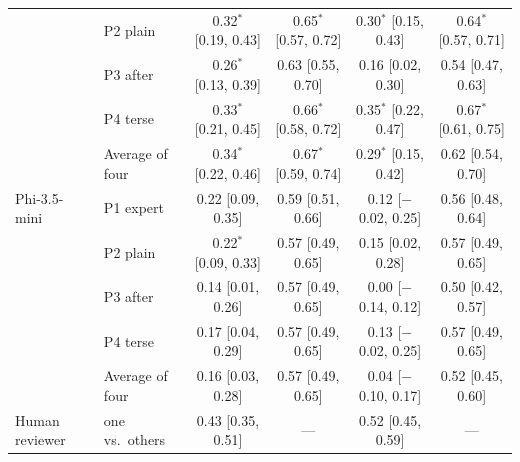 \begin{tabular}{llcccc}
 & P2 plain & 0.32$^{*}$ {\scriptsize[0.19, 0.43]} & 0.65$^{*}$ {\scriptsize[0.57, 0.72]} & 0.30$^{*}$ {\scriptsize[0.15, 0.43]} & 0.64$^{*}$ {\scriptsize[0.57, 0.71]} \\
 & P3 after & 0.26$^{*}$ {\scriptsize[0.13, 0.39]} & 0.63 {\scriptsize[0.55, 0.70]} & 0.16 {\scriptsize[0.02, 0.30]} & 0.54 {\scriptsize[0.47, 0.63]} \\
 & P4 terse & 0.33$^{*}$ {\scriptsize[0.21, 0.45]} & 0.66$^{*}$ {\scriptsize[0.58, 0.72]} & 0.35$^{*}$ {\scriptsize[0.22, 0.47]} & 0.67$^{*}$ {\scriptsize[0.61, 0.75]} \\
 & Average of four & 0.34$^{*}$ {\scriptsize[0.22, 0.46]} & 0.67$^{*}$ {\scriptsize[0.59, 0.74]} & 0.29$^{*}$ {\scriptsize[0.15, 0.42]} & 0.62 {\scriptsize[0.54, 0.70]} \\
\midrule
Phi-3.5-mini & P1 expert & 0.22 {\scriptsize[0.09, 0.35]} & 0.59 {\scriptsize[0.51, 0.66]} & 0.12 {\scriptsize[$-$0.02, 0.25]} & 0.56 {\scriptsize[0.48, 0.64]} \\
 & P2 plain & 0.22$^{*}$ {\scriptsize[0.09, 0.33]} & 0.57 {\scriptsize[0.49, 0.65]} & 0.15 {\scriptsize[0.02, 0.28]} & 0.57 {\scriptsize[0.49, 0.65]} \\
 & P3 after & 0.14 {\scriptsize[0.01, 0.26]} & 0.57 {\scriptsize[0.49, 0.65]} & 0.00 {\scriptsize[$-$0.14, 0.12]} & 0.50 {\scriptsize[0.42, 0.57]} \\
 & P4 terse & 0.17 {\scriptsize[0.04, 0.29]} & 0.57 {\scriptsize[0.49, 0.65]} & 0.13 {\scriptsize[$-$0.02, 0.25]} & 0.57 {\scriptsize[0.49, 0.65]} \\
 & Average of four & 0.16 {\scriptsize[0.03, 0.28]} & 0.57 {\scriptsize[0.49, 0.65]} & 0.04 {\scriptsize[$-$0.10, 0.17]} & 0.52 {\scriptsize[0.45, 0.60]} \\
\midrule
Human reviewer & one vs.\ others & 0.43 {\scriptsize[0.35, 0.51]} & --- & 0.52 {\scriptsize[0.45, 0.59]} & --- \\
\bottomrule
\end{tabular}

